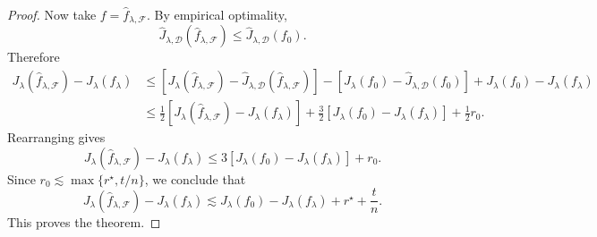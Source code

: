\documentclass[11pt]{article}
\theoremstyle{plain}
\theoremstyle{definition}
\theoremstyle{remark}
\begin{document}
\begin{proof}
Now take \(f=\widehat f_{\lambda,\mathcal F}\). By empirical optimality,
\[
\widehat J_{\lambda,\mathcal D}(\widehat f_{\lambda,\mathcal F})
\le
\widehat J_{\lambda,\mathcal D}(f_0).
\]
Therefore
\[
\begin{aligned}
J_\lambda(\widehat f_{\lambda,\mathcal F})
-
J_\lambda(f_\lambda)
&\le
\left[
J_\lambda(\widehat f_{\lambda,\mathcal F})
-
\widehat J_{\lambda,\mathcal D}(\widehat f_{\lambda,\mathcal F})
\right]
-
\left[
J_\lambda(f_0)
-
\widehat J_{\lambda,\mathcal D}(f_0)
\right]
+
J_\lambda(f_0)-J_\lambda(f_\lambda)\\
&\le
\frac12\left[
J_\lambda(\widehat f_{\lambda,\mathcal F})-J_\lambda(f_\lambda)
\right]
+
\frac32\left[
J_\lambda(f_0)-J_\lambda(f_\lambda)
\right]
+
\frac12r_0.
\end{aligned}
\]
Rearranging gives
\[
J_\lambda(\widehat f_{\lambda,\mathcal F})-J_\lambda(f_\lambda)
\le
3\left[J_\lambda(f_0)-J_\lambda(f_\lambda)\right]+r_0.
\]
Since \(r_0\lesssim \max\{r^\star,t/n\}\), we conclude that
\[
J_\lambda(\widehat f_{\lambda,\mathcal F})
-
J_\lambda(f_\lambda)
\lesssim
J_\lambda(f_0)-J_\lambda(f_\lambda)+r^\star+\frac{t}{n}.
\]
This proves the theorem.
\end{proof}
\end{document}
